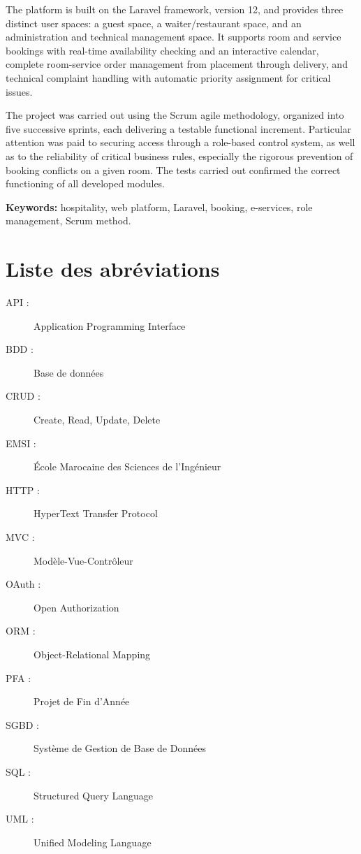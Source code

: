 \documentclass[12pt,a4paper]{report}
\begin{document}
The platform is built on the Laravel framework, version 12, and provides
three distinct user spaces: a guest space, a waiter/restaurant space, and
an administration and technical management space. It supports room and
service bookings with real-time availability checking and an interactive
calendar, complete room-service order management from placement through
delivery, and technical complaint handling with automatic priority
assignment for critical issues.

The project was carried out using the Scrum agile methodology, organized
into five successive sprints, each delivering a testable functional
increment. Particular attention was paid to securing access through a
role-based control system, as well as to the reliability of critical
business rules, especially the rigorous prevention of booking conflicts on
a given room. The tests carried out confirmed the correct functioning of
all developed modules.

\vspace{0.5cm}
\noindent\textbf{Keywords:} hospitality, web platform, Laravel, booking,
e-services, role management, Scrum method.

\clearpage

\chapter*{Liste des abréviations}

\begin{description}
    \item[API :] Application Programming Interface
    \item[BDD :] Base de données
    \item[CRUD :] Create, Read, Update, Delete
    \item[EMSI :] École Marocaine des Sciences de l'Ingénieur
    \item[HTTP :] HyperText Transfer Protocol
    \item[MVC :] Modèle-Vue-Contrôleur
    \item[OAuth :] Open Authorization
    \item[ORM :] Object-Relational Mapping
    \item[PFA :] Projet de Fin d'Année
    \item[SGBD :] Système de Gestion de Base de Données
    \item[SQL :] Structured Query Language
    \item[UML :] Unified Modeling Language
\end{description}
\end{document}
